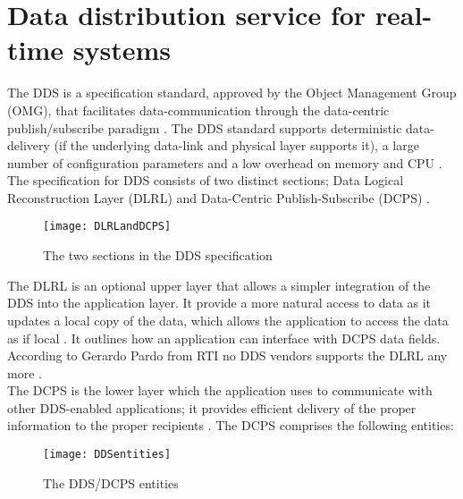 \documentclass[Main]{subfiles}
\begin{document}
\section{Data distribution service for real-time systems}
The DDS is a specification standard, approved by the Object Management Group (OMG), that facilitates data-communication through the data-centric publish/subscribe paradigm \cite{RTI}. 
The DDS standard supports deterministic data-delivery (if the underlying data-link and physical layer supports it), a large number of configuration parameters and a low overhead on memory and CPU \cite{DDS-slides}.
\\
The specification for DDS consists of two distinct sections; Data Logical Reconstruction Layer (DLRL) and Data-Centric Publish-Subscribe (DCPS) \cite{DDS-slides}.

\begin{figure}[H]
\centering
\texttt{[image: DLRLandDCPS]}
\caption{The two sections in the DDS specification \cite{DDS-slides}}
\label{Fig:DLRL}
\end{figure}

The DLRL is an optional upper layer that allows a simpler integration of the DDS into the application layer. It provide a more natural access to data as it updates a local copy of the data, which allows the application to access the data as if local \cite{DDS-slides}. It outlines how an application can interface with DCPS data fields. According to Gerardo Pardo from RTI no DDS vendors supports the DLRL any more \cite{DLRL-support}.\\
The DCPS is the lower layer which the application uses to communicate with other DDS-enabled applications; it provides efficient delivery of the proper information to the proper recipients \cite{wiki-DDS}. The DCPS comprises the following entities:

\begin{figure}[H]
\centering
\texttt{[image: DDSentities]}
\caption{The DDS/DCPS entities \cite{RTI}}
\label{Fig:Entities}
\end{figure}
\end{document}
